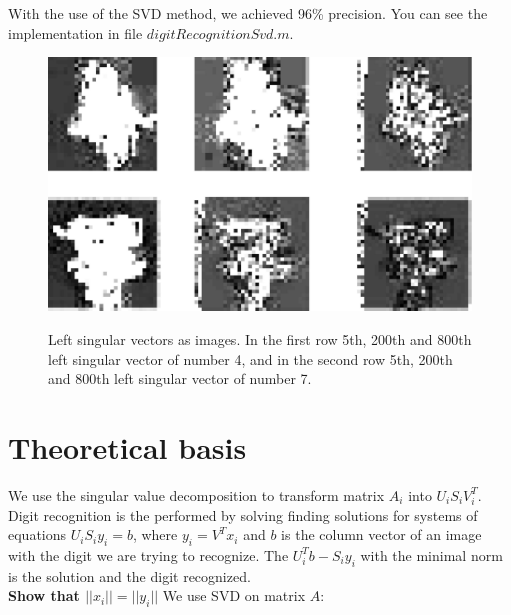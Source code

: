 \documentclass[12pt]{article}
\begin{document}
\newline
\newline
With the use of the SVD method, we achieved 96\% precision. You can see the implementation in file $digitRecognitionSvd.m$.
\newline
\begin{figure}[h]
	\centering
	\includegraphics[clip,scale=0.375]{images/numbers.png}\underline{}
	\caption[Left singular vectors as images]{Left singular vectors as images. In the first row 5th, 200th and 800th left singular vector of number 4, and in the second row 5th, 200th and 800th left singular vector of number 7.}
	
\end{figure}
\newpage
\section{Theoretical basis}
We use the singular value decomposition to transform matrix $A_i$ into $U_iS_iV_i^{T}$. Digit recognition is the performed by solving finding solutions for systems of equations $U_iS_iy_i = b$, where $y_i = V^Tx_i$ and $b$ is the column vector of an image with the digit we are trying to recognize. The $U_i^{T}b - S_iy_i$ with the minimal norm is the solution and the digit recognized. \\
\newline
\textbf{Show that $||x_i|| = ||y_i||$} 
\newline
We use SVD on matrix $A$:
\end{document}
